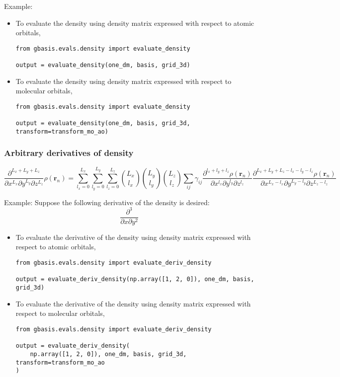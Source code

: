 \documentclass[letterpaper]{article}
\begin{document}
Example:
\begin{itemize}
\item To evaluate the density using density matrix expressed with respect to
  atomic orbitals,
  \begin{lstlisting}[xleftmargin=-25pt]
from gbasis.evals.density import evaluate_density

output = evaluate_density(one_dm, basis, grid_3d)
\end{lstlisting}
\item To evaluate the density using density matrix expressed with respect to
  molecular orbitals,
  \begin{lstlisting}[xleftmargin=-25pt]
from gbasis.evals.density import evaluate_density

output = evaluate_density(one_dm, basis, grid_3d, transform=transform_mo_ao)
\end{lstlisting}
\end{itemize}
\subsubsection{Arbitrary derivatives of density}
\begin{equation}
  \frac{\partial^{L_x + L_y + L_z}}{\partial x^{L_x} \partial y^{L_y} \partial z^{L_z}}
  \rho(\mathbf{r}_n)
  =
  \sum_{l_x=0}^{L_x} \sum_{l_y=0}^{L_y} \sum_{l_z=0}^{L_z}
  \binom{L_x}{l_x} \binom{L_y}{l_y} \binom{L_z}{l_z}
  \sum_{ij} \gamma_{ij}
  \frac{\partial^{l_x + l_y + l_z} \rho(\mathbf{r}_n)}{\partial x^{l_x} \partial y^{l_y} \partial z^{l_z}}
  \frac{
    \partial^{L_x + L_y + L_z - l_x - l_y - l_z} \rho(\mathbf{r}_n)
  }{
    \partial x^{L_x - l_x} \partial y^{L_y - l_y} \partial z^{L_z - l_z}
  }
\end{equation}

Example:
Suppose the following derivative of the density is desired:
\begin{equation}
  \frac{\partial^3}{\partial x \partial y^2}
\end{equation}
\begin{itemize}
\item To evaluate the derivative of the density using density matrix expressed
  with respect to atomic orbitals,
  \begin{lstlisting}[xleftmargin=-25pt]
from gbasis.evals.density import evaluate_deriv_density

output = evaluate_deriv_density(np.array([1, 2, 0]), one_dm, basis, grid_3d)
\end{lstlisting}
\item To evaluate the derivative of the density using density matrix expressed
  with respect to molecular orbitals,
\begin{lstlisting}
from gbasis.evals.density import evaluate_deriv_density

output = evaluate_deriv_density(
    np.array([1, 2, 0]), one_dm, basis, grid_3d, transform=transform_mo_ao
)
\end{lstlisting}
\end{itemize}
\end{document}
